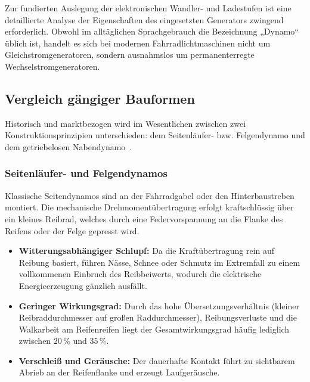 \documentclass[12pt,a4paper]{article}
\begin{document}
Zur fundierten Auslegung der elektronischen Wandler- und Ladestufen ist eine detaillierte Analyse der Eigenschaften 
des eingesetzten Generators zwingend erforderlich. Obwohl im alltäglichen Sprachgebrauch die Bezeichnung „Dynamo``
üblich ist, handelt es sich bei modernen Fahrradlichtmaschinen nicht um Gleichstromgeneratoren, sondern ausnahmslos 
um permanenterregte Wechselstromgeneratoren.

\subsection{Vergleich gängiger Bauformen}
Historisch und marktbezogen wird im Wesentlichen zwischen zwei Konstruktionsprinzipien unterschieden: 
dem Seitenläufer- bzw. Felgendynamo und dem getriebelosen Nabendynamo~\cite{schmidt2006}.

\subsubsection{Seitenläufer- und Felgendynamos}
Klassische Seitendynamos sind an der Fahrradgabel oder den Hinterbaustreben montiert. Die mechanische Drehmomentübertragung erfolgt 
kraftschlüssig über ein kleines Reibrad, welches durch eine Federvorspannung an die Flanke des Reifens oder der Felge gepresst wird. 
\begin{itemize}
    \item \textbf{Witterungsabhängiger Schlupf:} 
    Da die Kraftübertragung rein auf Reibung basiert, führen Nässe, Schnee oder Schmutz im Extremfall zu einem vollkommenen Einbruch 
    des Reibbeiwerts, wodurch die elektrische Energieerzeugung gänzlich ausfällt.
    \item \textbf{Geringer Wirkungsgrad:} 
    Durch das hohe Übersetzungsverhältnis (kleiner Reibraddurchmesser auf großen Raddurchmesser), Reibungsverluste und die Walkarbeit 
    am Reifenreifen liegt der Gesamtwirkungsgrad häufig lediglich zwischen $20\,\%$ und $35\,\%$.
    \item \textbf{Verschleiß und Geräusche:} 
    Der dauerhafte Kontakt führt zu sichtbarem Abrieb an der Reifenflanke und erzeugt Laufgeräusche.
\end{itemize}
\end{document}
